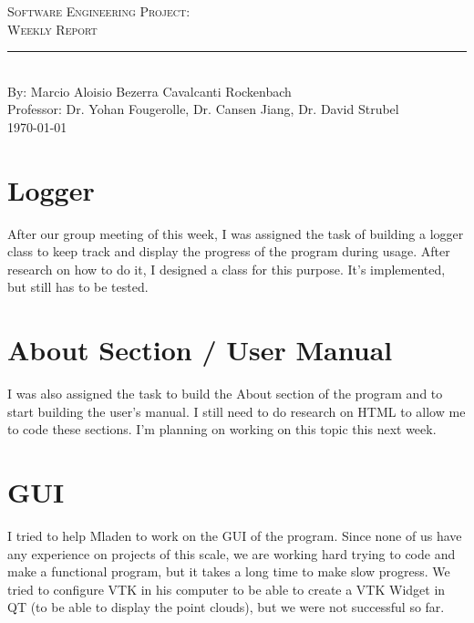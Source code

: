 \documentclass[aps,letterpaper,11pt]{revtex4}
\newcommand{\labno}{Software Engineering Project}
\newcommand{\labtitle}{Weekly Report}
\newcommand{\authorname}{Marcio Aloisio Bezerra Cavalcanti Rockenbach}
\newcommand{\professor}{Dr. Yohan Fougerolle, Dr. Cansen Jiang, Dr. David Strubel}
\begin{document}
  
\begin{titlepage}
\begin{center}
{\LARGE \textsc{\labno:} \\ \vspace{4pt}}
{\Large \textsc{\labtitle} \\ \vspace{4pt}} 
\rule[13pt]{\textwidth}{1pt} \\ \vspace{150pt}
{\large By: \authorname \\ \vspace{10pt}
Professor: \professor \\ \vspace{10pt}
\today}
\end{center}


\end{titlepage}%
\newpage
\setlength{\parindent}{5ex}

\section{Logger}
After our group meeting of this week, I was assigned the task of building a logger class to keep track and display the progress of the program during usage. After research on how to do it, I designed a class for this purpose. It's implemented, but still has to be tested.\\

\section{About Section / User Manual}
I was also assigned the task to build the About section of the program and to start building the user's manual. I still need to do research on HTML to allow me to code these sections. I'm planning on working on this topic this next week.\\

\section{GUI}
I tried to help Mladen to work on the GUI of the program. Since none of us have any experience on projects of this scale, we are working hard trying to code and make a functional program, but it takes a long time to make slow progress. We tried to configure VTK in his computer to be able to create a VTK Widget in QT (to be able to display the point clouds), but we were not successful so far.\\
\end{document}
